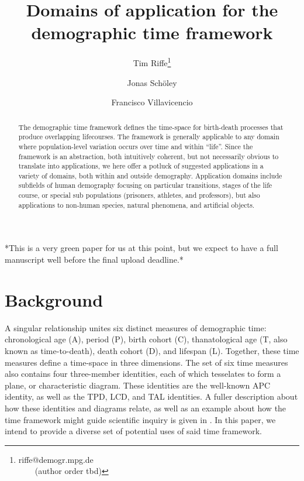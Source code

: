 \documentclass[11pt,oneside]{article} %
\begin{document}
\title{Domains of application for the demographic time framework}

\author[1]{Tim Riffe\thanks{riffe@demogr.mpg.de\\ ~~~~(author order tbd)}}
\author[2,3]{Jonas Sch{\"o}ley}
\author[2,3]{Francisco Villavicencio}



\maketitle

\begin{abstract}
The demographic time framework defines the time-space for birth-death processes
that produce overlapping lifecourses. The framework is generally applicable to
any domain where population-level variation occurs over time and within ``life''. Since the
framework is an abstraction, both intuitively coherent, but not
necessarily obvious to translate into applications, we here offer a potluck of
suggested applications in a variety of domains, both within and outside demography.
Application domains include subfields of human demography focusing on particular transitions, stages of the life course, or special sub populations (prisoners, athletes, and professors), but also applications to non-human species, natural phenomena, and artificial objects.
\end{abstract}

*This is a very green paper for us at this point, but we expect to have a full
manuscript well before the final upload deadline.*

\section*{Background}


A singular relationship unites six distinct measures of demographic time:
chronological age (A), period (P), birth cohort (C), thanatological age (T,
also known as time-to-death), death cohort (D), and lifespan (L). Together,
these time measures define a time-space in three dimensions. The set of six
time measures also contains four three-member identities, each of which
tesselates to form a plane, or characteristic diagram. These identities are the
well-known APC identity, as well as the TPD, LCD, and TAL identities. A
fuller description about how these identities and diagrams relate, as well as an
example about how the time framework might guide scientific inquiry is given in
\citet{rsv2015}. In this paper, we intend to provide a diverse set of potential
uses of said time framework.
\end{document}
